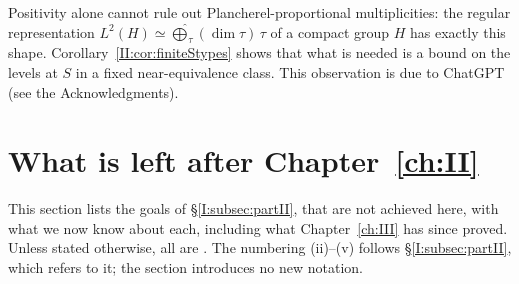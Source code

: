 \begin{remark}
Positivity alone cannot rule out Plancherel-proportional multiplicities: the regular representation $L^2(H)\simeq\widehat\bigoplus_\tau(\dim\tau)\,\tau$ of a compact group $H$ has exactly this shape. Corollary~\ref{II:cor:finiteStypes} shows that what is needed is a bound on the levels at $S$ in a fixed near-equivalence class. This observation is due to ChatGPT (see the Acknowledgments).
\end{remark}

\section{What is left after Chapter~\ref{ch:II}}\label{II:sec:partIII}
This section lists the goals of \S\ref{I:subsec:partII}, that are not achieved here, with what we now know about each, including what Chapter~\ref{ch:III} has since proved. Unless stated otherwise, all are \Cv. The numbering (ii)--(v) follows \S\ref{I:subsec:partII}, which refers to it; the section introduces no new notation.

